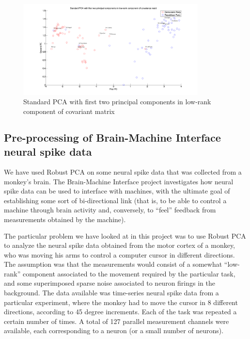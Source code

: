 \begin{figure}[h]
  \centering
  \includegraphics[width=0.85\textwidth]{../figures/vote_cov_lr_pca.pdf}
  \caption{Standard PCA with first two principal components in low-rank component of covariant matrix}
  \label{fig:vote:covariant:lr:pca}
\end{figure}



\subsection{Pre-processing of Brain-Machine Interface neural spike data}

We have used Robust PCA on some neural spike data that was collected from a monkey's brain. The Brain-Machine Interface project investigates how neural spike data can be used to interface with machines, with the ultimate goal of establishing some sort of bi-directional link (that is, to be able to control a machine through brain activity and, conversely, to ``feel'' feedback from measurements obtained by the machine). 

The particular problem we have looked at in this project was to use Robust PCA to analyze the neural spike data obtained from the motor cortex of a monkey, who was moving his arms to control a computer cursor in different directions. The assumption was that the measurements would consist of a somewhat ``low-rank'' component associated to the movement required by the particular task, and some superimposed sparse noise associated to neuron firings in the background. The data available was time-series neural spike data from a particular experiment, where the monkey had to move the cursor in 8 different directions, according to 45 degree increments. Each of the task was repeated a certain number of times. A total of 127 parallel measurement channels were available, each corresponding to a neuron (or a small number of neurons). 

